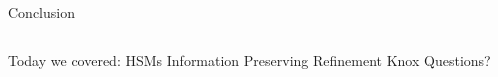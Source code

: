\begin{frame}{Conclusion}
\begin{columns}
\begin{center}
\begin{outline}
\1 Today we covered:
\2 HSMs 
\2 Information Preserving Refinement 
\2 Knox 
\1 Questions?
\end{outline}
\end{center}

\begin{center}
\end{center}

\end{columns}
\end{frame}
